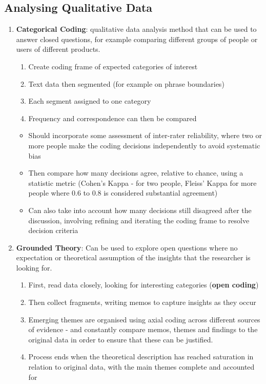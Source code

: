 \documentclass{article}
\begin{document}
\subsection{Analysing Qualitative Data}
\begin{enumerate}
    \item \textbf{Categorical Coding}: qualitative data analysis method that can be used to answer closed questions, for example comparing different groups of people or users of different products.
    \begin{enumerate}
        \item Create coding frame of expected categories of interest
        \item Text data then segmented (for example on phrase boundaries)
        \item Each segment assigned to one category
        \item Frequency and correspondence can then be compared
    \end{enumerate}
    
    \begin{itemize}
        \item Should incorporate some assessment of inter-rater reliability, where two or more people make the coding decisions independently to avoid systematic bias
        \item Then compare how many decisions agree, relative to chance, using a statistic metric (Cohen's Kappa - for two people, Fleiss' Kappa for more people where 0.6 to 0.8 is considered substantial agreement)
        \item Can also take into account how many decisions still disagreed after the discussion, involving refining and iterating the coding frame to resolve decision criteria
    \end{itemize}
    
    \item \textbf{Grounded Theory}: Can be used to explore open questions where no expectation or theoretical assumption of the insights that the researcher is looking for. 
    \begin{enumerate}
        \item First, read data closely, looking for interesting categories (\textbf{open coding})
        \item Then collect fragments, writing memos to capture insights as they occur
        \item Emerging themes are organised using axial coding across different sources of evidence - and constantly compare memos, themes and findings to the original data in order to ensure that these can be justified.
        \item Process ends when the theoretical description has reached saturation in relation to original data, with the main themes complete and accounted for
    \end{enumerate}
\end{enumerate}
\end{document}
